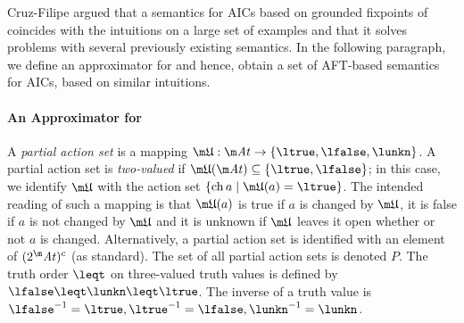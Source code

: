 Cruz-Filipe argued that a semantics for AICs based on grounded fixpoints of \Op coincides with the intuitions on a large set of  examples and that it solves problems with several previously existing semantics. 
In the following paragraph, we define an approximator for \Op and hence, obtain a set of AFT-based semantics for AICs, based on similar intuitions. 



% 

\paragraph{An Approximator for \Op}

A \emph{partial action set} is a mapping $\UUU:\atoms \to \{\ltrue,\lfalse,\lunkn\}$. A partial action set \UUU is \emph{two-valued} if $\UUU(\atoms)\subseteq\{\ltrue,\lfalse\}$; in this case, we identify $\UUU$ with the action set $\{\change a\mid \UUU(a)=\ltrue\}$. 
The intended reading of such a mapping is that $\UUU(a)$ is true if $a$ is changed by $\UUU$, it is false if $a$ is not changed by $\UUU$ and it is unknown if $\UUU$ leaves it open whether or not $a$ is changed. 
Alternatively, a partial action set is identified with an element of $(2^\atoms)^c$ (as standard). 
The set of all partial action sets is denoted $P$.
The truth order $\leqt$ on three-valued truth values is defined by $\lfalse\leqt\lunkn\leqt\ltrue$. The inverse of a truth value is $\lfalse^{-1}=\ltrue, \ltrue^{-1}=\lfalse, \lunkn^{-1}=\lunkn$.

